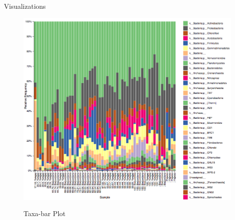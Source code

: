 \documentclass[final]{beamer}
\newlength{\colwidth}
\begin{document}
\begin{frame}[t]
\begin{columns}[t]
\begin{column}{\colwidth}
\begin{block}{Visualizations}
    \begin{figure}[tph!]
      {\includegraphics[width=\linewidth]{assets/taxabar-plot}}
      \caption{Taxa-bar Plot}
      \label{fig:taxabar-plot}
    \end{figure}
  \end{block}


\end{column}
\end{columns}
\end{frame}
\end{document}
